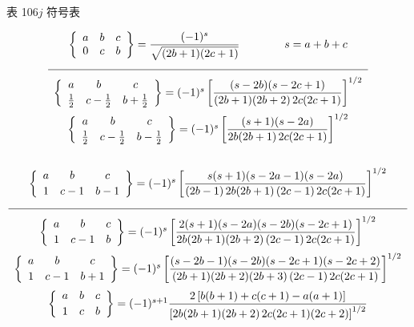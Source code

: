 \noindent\begin{minipage}{\linewidth}\centering
{\heiti 表 10}\quad $6j$ 符号表\par\smallskip
\begin{equation*}
\begin{array}{c}
\left\{\begin{array}{ccc}a&b&c\\0&c&b\end{array}\right\}
=\dfrac{(-1)^s}{\sqrt{(2b+1)(2c+1)}}\qquad\qquad s=a+b+c\\[1.6em]
\hline\\[-0.6em]
\left\{\begin{array}{ccc}a&b&c\\[2pt]\tfrac12&c-\tfrac12&b+\tfrac12\end{array}\right\}
=(-1)^s\left[\dfrac{(s-2b)(s-2c+1)}{(2b+1)(2b+2)\,2c(2c+1)}\right]^{1/2}\\[1.2em]
\left\{\begin{array}{ccc}a&b&c\\[2pt]\tfrac12&c-\tfrac12&b-\tfrac12\end{array}\right\}
=(-1)^s\left[\dfrac{(s+1)(s-2a)}{2b(2b+1)\,2c(2c+1)}\right]^{1/2}\\[1.6em]
\end{array}
\end{equation*}
\end{minipage}\par\smallskip\noindent
\begin{equation*}
\begin{array}{c}

\left\{\begin{array}{ccc}a&b&c\\[2pt]1&c-1&b-1\end{array}\right\}
=(-1)^s\left[\dfrac{s(s+1)(s-2a-1)(s-2a)}
{(2b-1)\,2b(2b+1)\,(2c-1)\,2c(2c+1)}\right]^{1/2}\\[1.6em]
\hline\\[-0.6em]
\left\{\begin{array}{ccc}a&b&c\\[2pt]1&c-1&b\end{array}\right\}
=(-1)^s\left[\dfrac{2(s+1)(s-2a)(s-2b)(s-2c+1)}
{2b(2b+1)(2b+2)\,(2c-1)\,2c(2c+1)}\right]^{1/2}\\[1.2em]
\left\{\begin{array}{ccc}a&b&c\\[2pt]1&c-1&b+1\end{array}\right\}
=(-1)^s\left[\dfrac{(s-2b-1)(s-2b)(s-2c+1)(s-2c+2)}
{(2b+1)(2b+2)(2b+3)\,(2c-1)\,2c(2c+1)}\right]^{1/2}\\[1.2em]
\left\{\begin{array}{ccc}a&b&c\\[2pt]1&c&b\end{array}\right\}
=(-1)^{s+1}\dfrac{2\left[b(b+1)+c(c+1)-a(a+1)\right]}
{\left[2b(2b+1)(2b+2)\,2c(2c+1)(2c+2)\right]^{1/2}}
\end{array}
\end{equation*}

